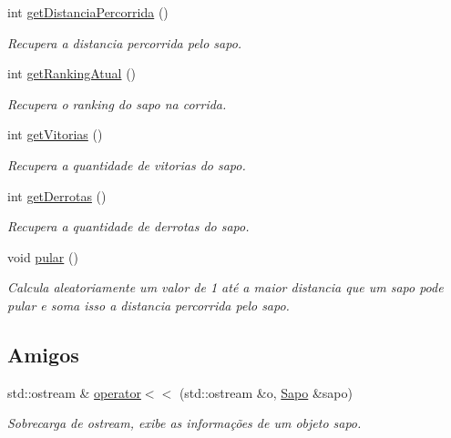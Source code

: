 \begin{DoxyCompactItemize}
int \hyperlink{classSapo_a41a99439aacf25a65c60622eb7e65f60}{get\+Distancia\+Percorrida} ()
\begin{DoxyCompactList}\small\item\em Recupera a distancia percorrida pelo sapo. \end{DoxyCompactList}\item 
int \hyperlink{classSapo_abc038f72258ba546123efa8d1eb4c392}{get\+Ranking\+Atual} ()
\begin{DoxyCompactList}\small\item\em Recupera o ranking do sapo na corrida. \end{DoxyCompactList}\item 
int \hyperlink{classSapo_a102f82c22691765c15873d4ea667156e}{get\+Vitorias} ()
\begin{DoxyCompactList}\small\item\em Recupera a quantidade de vitorias do sapo. \end{DoxyCompactList}\item 
int \hyperlink{classSapo_a0d11966d3b0e31828944b35e9b6bb1b1}{get\+Derrotas} ()
\begin{DoxyCompactList}\small\item\em Recupera a quantidade de derrotas do sapo. \end{DoxyCompactList}\item 
void \hyperlink{classSapo_a32e61c61677967120ae652099bd56805}{pular} ()
\begin{DoxyCompactList}\small\item\em Calcula aleatoriamente um valor de 1 até a maior distancia que um sapo pode pular e soma isso a distancia percorrida pelo sapo. \end{DoxyCompactList}\end{DoxyCompactItemize}
\subsection*{Amigos}
\begin{DoxyCompactItemize}
\item 
std\+::ostream \& \hyperlink{classSapo_a295992e9cef7ed41031bd2a0a9e70646}{operator$<$$<$} (std\+::ostream \&o, \hyperlink{classSapo}{Sapo} \&sapo)
\begin{DoxyCompactList}\small\item\em Sobrecarga de ostream, exibe as informações de um objeto sapo. \end{DoxyCompactList}\end{DoxyCompactItemize}


